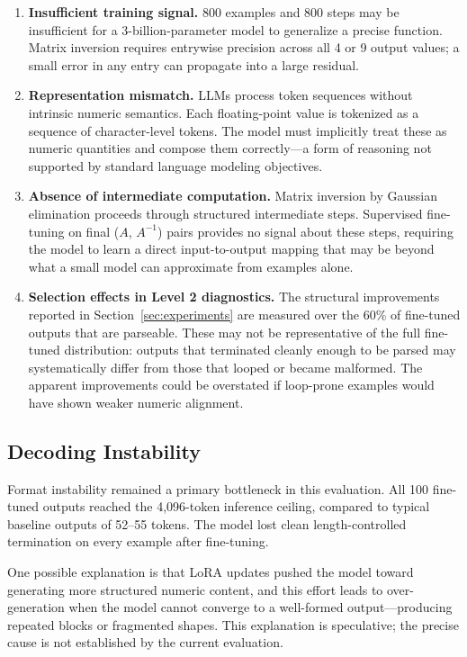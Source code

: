 \begin{enumerate}
    \item \textbf{Insufficient training signal.} 800 examples and 800 steps may be insufficient for a 3-billion-parameter model to generalize a precise function. Matrix inversion requires entrywise precision across all 4 or 9 output values; a small error in any entry can propagate into a large residual.

    \item \textbf{Representation mismatch.} LLMs process token sequences without intrinsic numeric semantics. Each floating-point value is tokenized as a sequence of character-level tokens. The model must implicitly treat these as numeric quantities and compose them correctly---a form of reasoning not supported by standard language modeling objectives.

    \item \textbf{Absence of intermediate computation.} Matrix inversion by Gaussian elimination proceeds through structured intermediate steps. Supervised fine-tuning on final ($A$, $A^{-1}$) pairs provides no signal about these steps, requiring the model to learn a direct input-to-output mapping that may be beyond what a small model can approximate from examples alone.

    \item \textbf{Selection effects in Level 2 diagnostics.} The structural improvements reported in Section~\ref{sec:experiments} are measured over the 60\% of fine-tuned outputs that are parseable. These may not be representative of the full fine-tuned distribution: outputs that terminated cleanly enough to be parsed may systematically differ from those that looped or became malformed. The apparent improvements could be overstated if loop-prone examples would have shown weaker numeric alignment.
\end{enumerate}

\subsection{Decoding Instability}

Format instability remained a primary bottleneck in this evaluation. All 100 fine-tuned outputs reached the 4{,}096-token inference ceiling, compared to typical baseline outputs of 52--55 tokens. The model lost clean length-controlled termination on every example after fine-tuning.

One possible explanation is that LoRA updates pushed the model toward generating more structured numeric content, and this effort leads to over-generation when the model cannot converge to a well-formed output---producing repeated blocks or fragmented shapes. This explanation is speculative; the precise cause is not established by the current evaluation.

